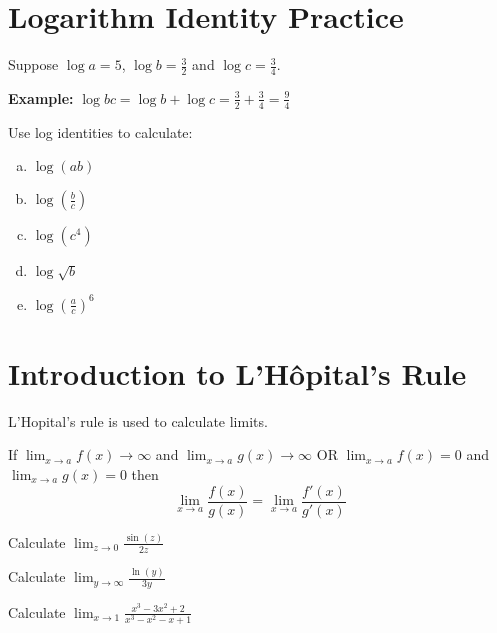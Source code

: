 \documentclass[12pt]{article}
\newenvironment{problem}[2][Problem]{\begin{trivlist}
\item[\hskip \labelsep {\bfseries #1}\hskip \labelsep {\bfseries #2.}]}{\end{trivlist}}
\begin{document}
\section*{Logarithm Identity Practice}

\begin{problem}{1}
Suppose $\log a=5$, $\log b=\frac{3}{2}$ and $\log c=\frac{3}{4}$. 

\textbf{Example:} $\log bc = \log b + \log c = \frac{3}{2} + \frac{3}{4}= \frac{9}{4}$

Use log identities to calculate:

\begin{enumerate}[(a)] %
\item $\log(ab)$
\vspace{.3in}
\item $\displaystyle{\log\left(\frac{b}{c}\right)}$
\vspace{.3in}
\item $\log(c^4)$
\vspace{.3in}
\item $\log\sqrt{b}$
\vspace{.3in}
\item $\displaystyle{\log\left(\frac{a}{c}\right)^6}$
\vspace{.3in}

\end{enumerate}
\end{problem}
\pagebreak


\pagebreak\section*{Introduction to L'H\^opital's Rule}

L'Hopital's rule is used to calculate limits.

\vspace{\baselineskip}
\noindent If $\displaystyle{\lim_{x\to a} f(x)\to\infty}$ and $\displaystyle{\lim_{x\to a} g(x)\to\infty}$ OR $\displaystyle{\lim_{x\to a} f(x)=0}$ and $\displaystyle{\lim_{x\to a} g(x)=0}$   then
$$\lim_{x\to a} \frac{f(x)}{g(x)} = \lim_{x\to a} \frac{f'(x)}{g'(x)}$$ 

\begin{problem}{1}
Calculate
$\displaystyle{\lim_{z\to 0} \frac{\sin(z)}{2z}}$
\end{problem}
\vspace{2in}
\begin{problem}{2}
Calculate $\displaystyle{\lim_{y\to \infty} \frac{\ln(y)}{3y}}$
 \end{problem}
 \begin{problem}{3}
 Calculate  $\displaystyle{\lim_{x\to 1} \frac{x^3-3x^2+2}{x^3-x^2-x+1}}$
 \end{problem}
  
\end{document}
